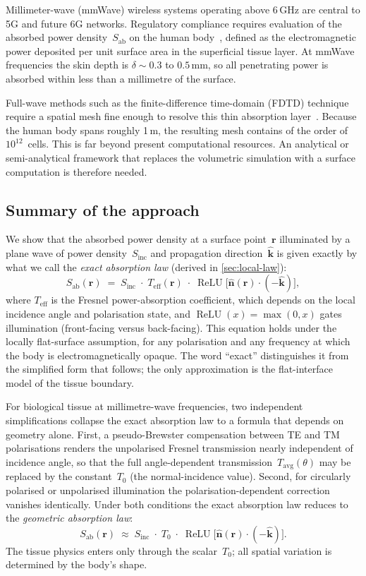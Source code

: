 \documentclass[11pt,a4paper]{article}
\theoremstyle{definition}      %
\newcommand{\khat}{\hat{\bm{k}}}
\newcommand{\nhat}{\hat{\bm{n}}}
\newcommand{\rr}{\mathbf{r}}
\newcommand{\Sinc}{S_{\mathrm{inc}}}
\newcommand{\Sab}{S_{\mathrm{ab}}}
\newcommand{\Teff}{T_{\mathrm{eff}}}
\newcommand{\Tavg}{T_{\mathrm{avg}}}
\DeclareMathOperator{\ReLU}{ReLU}
\begin{document}
Millimeter-wave (mmWave) wireless systems operating above 6\,GHz are
central to 5G and future 6G networks.  Regulatory compliance requires
evaluation of the absorbed power density~$\Sab$ on the human
body~\cite{ICNIRP2020}, defined as the electromagnetic power deposited
per unit surface area in the superficial tissue layer.  At mmWave
frequencies the skin depth is $\delta\sim 0.3$ to $0.5$\,mm, so all
penetrating power is absorbed within less than a millimetre of the
surface.

Full-wave methods such as the finite-difference time-domain (FDTD)
technique require a spatial mesh fine enough to resolve this thin
absorption layer~\cite{Dimbylow2002,Hirata2021}.  Because the human
body spans roughly 1\,m, the resulting mesh contains of the order of
$10^{12}$~cells.  This is far beyond present computational resources.
An analytical or semi-analytical framework that replaces the volumetric
simulation with a surface computation is therefore needed.

\subsection{Summary of the approach}

We show that the absorbed power density at a surface point~$\rr$
illuminated by a plane wave of power density~$\Sinc$ and propagation
direction~$\khat$ is given exactly by what we call the
\emph{exact absorption law} (derived in \cref{sec:local-law}):
\begin{equation}\label{eq:exact-law}
  \boxed{\Sab(\rr)
    \;=\; \Sinc\;\cdot\; \Teff(\rr)\;\cdot\;
    \ReLU\!\bigl[\nhat(\rr)\cdot(-\khat)\bigr],}
\end{equation}
where $\Teff$ is the Fresnel power-absorption coefficient, which
depends on the local incidence angle and polarisation state, and
$\ReLU(x)=\max(0,x)$ gates illumination (front-facing versus
back-facing).  This equation holds under the locally flat-surface
assumption, for any polarisation and any frequency at which the body
is electromagnetically opaque.  The word ``exact'' distinguishes it
from the simplified form that follows; the only approximation is the
flat-interface model of the tissue boundary.

For biological tissue at millimetre-wave frequencies, two independent
simplifications collapse the exact absorption law to a formula that
depends on geometry alone.  First, a pseudo-Brewster
compensation between TE and TM polarisations renders the unpolarised
Fresnel transmission nearly independent of incidence angle, so that
the full angle-dependent transmission~$\Tavg(\theta)$ may be replaced
by the constant~$T_0$ (the normal-incidence value).  Second,
for circularly polarised or unpolarised illumination the
polarisation-dependent correction vanishes identically.  Under both
conditions the exact absorption law reduces to the
\emph{geometric absorption law}:
\begin{equation}\label{eq:geometric-law}
  \boxed{\Sab(\rr)
    \;\approx\; \Sinc\;\cdot\; T_0\;\cdot\;
    \ReLU\!\bigl[\nhat(\rr)\cdot(-\khat)\bigr].}
\end{equation}
The tissue physics enters only through the scalar~$T_0$; all spatial
variation is determined by the body's shape.
\end{document}
